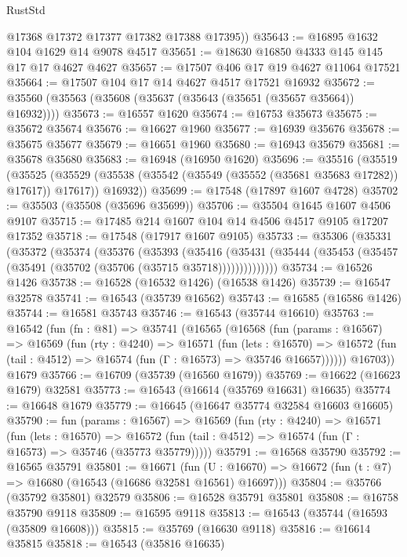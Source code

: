 \begin{lexlean}{RustStd}
\begin{coremodule}
        @17368
        @17372
        @17377
        @17382
        @17388
        @17395))
@35643 := @16895 @1632 @104 @1629 @14 @9078 @4517
@35651 := @18630 @16850 @4333 @145 @145 @17 @17 @4627 @4627
@35657 := @17507 @406 @17 @19 @4627 @11064 @17521
@35664 := @17507 @104 @17 @14 @4627 @4517 @17521 @16932
@35672 := @35560 (@35563 (@35608 (@35637 (@35643 (@35651 (@35657 @35664)) @16932))))
@35673 := @16557 @1620
@35674 := @16753 @35673
@35675 := @35672 @35674
@35676 := @16627 @1960
@35677 := @16939 @35676
@35678 := @35675 @35677
@35679 := @16651 @1960
@35680 := @16943 @35679
@35681 := @35678 @35680
@35683 := @16948 (@16950 @1620)
@35696 := @35516
    (@35519
      (@35525
        (@35529 (@35538 (@35542 (@35549 (@35552 (@35681 @35683 @17282)) @17617)) @17617))
        @16932))
@35699 := @17548 (@17897 @1607 @4728)
@35702 := @35503 (@35508 (@35696 @35699))
@35706 := @35504 @1645 @1607 @4506 @9107
@35715 := @17485 @214 @1607 @104 @14 @4506 @4517 @9105 @17207 @17352
@35718 := @17548 (@17917 @1607 @9105)
@35733 := @35306
    (@35331
      (@35372
        (@35374
          (@35376
            (@35393
              (@35416
                (@35431 (@35444 (@35453 (@35457 (@35491 (@35702 (@35706 (@35715 @35718))))))))))))))
@35734 := @16526 @1426
@35738 := @16528 (@16532 @1426) (@16538 @1426)
@35739 := @16547 @32578
@35741 := @16543 (@35739 @16562)
@35743 := @16585 (@16586 @1426)
@35744 := @16581 @35743
@35746 := @16543 (@35744 @16610)
@35763 := @16542
    (fun (fn : @81) =>
    @35741
      (@16565
        (@16568
          (fun (params : @16567) =>
          @16569
            (fun (rty : @4240) =>
            @16571
              (fun (lets : @16570) =>
              @16572 (fun (tail : @4512) => @16574 (fun (Γ : @16573) => @35746 @16657))))))
        @16703))
    @1679
@35766 := @16709 (@35739 (@16560 @1679))
@35769 := @16622 (@16623 @1679) @32581
@35773 := @16543 (@16614 (@35769 @16631) @16635)
@35774 := @16648 @1679
@35779 := @16645 (@16647 @35774 @32584 @16603 @16605)
@35790 := fun (params : @16567) =>
  @16569
    (fun (rty : @4240) =>
    @16571
      (fun (lets : @16570) =>
      @16572 (fun (tail : @4512) => @16574 (fun (Γ : @16573) => @35746 (@35773 @35779)))))
@35791 := @16568 @35790
@35792 := @16565 @35791
@35801 := @16671
    (fun (U : @16670) => @16672 (fun (t : @7) => @16680 (@16543 (@16686 @32581 @16561) @16697)))
@35804 := @35766 (@35792 @35801) @32579
@35806 := @16528 @35791 @35801
@35808 := @16758 @35790 @9118
@35809 := @16595 @9118
@35813 := @16543 (@35744 (@16593 (@35809 @16608)))
@35815 := @35769 (@16630 @9118)
@35816 := @16614 @35815
@35818 := @16543 (@35816 @16635)

\end{coremodule}
\end{lexlean}
